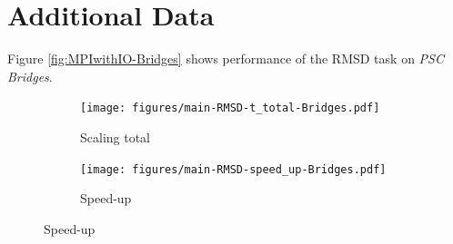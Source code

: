 
\section{Additional Data}
\label{sec:supplement}

Figure \ref{fig:MPIwithIO-Bridges} shows performance of the RMSD task on \emph{PSC Bridges}. 

\begin{figure}[!htb]
  \centering
  \begin{subfigure}{.4\textwidth}
    \texttt{[image: figures/main-RMSD-t\_total-Bridges.pdf]}
    \caption{Scaling total}
    \label{fig:MPIscaling-Bridges}
  \end{subfigure}
  \hfill
  \begin{subfigure}{.4\textwidth}
    \texttt{[image: figures/main-RMSD-speed\_up-Bridges.pdf]}
    \caption{Speed-up}
    \label{fig:MPIspeedup-Bridges}
  \end{subfigure}
  \bigskip


\end{figure}
